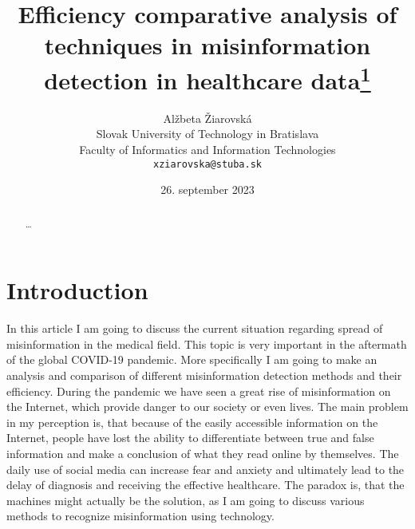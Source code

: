\documentclass[11pt ,english,a4paper]{article}
\title{Efficiency comparative analysis of techniques in misinformation detection in healthcare data\thanks{Semestral project in subject Engineering Methods, ac. year 2023/24, guidance: MSc. Mirwais Ahmadzai}}
\author{Alžbeta Žiarovská\\[2pt]
	{\small Slovak University of Technology in Bratislava}\\
	{\small Faculty of Informatics and Information Technologies}\\
	{\small \texttt{xziarovska@stuba.sk}}
	}
\date{\small 26. september 2023}
\begin{document}
\maketitle
\newpage

\begin{abstract}
\ldots
\end{abstract}
\newpage

\section{Introduction}\label{intro}

In this article I am going to discuss the current situation regarding spread of misinformation in the medical field. This topic is very important in the aftermath of the global COVID-19 pandemic. More specifically I am going to make an analysis and comparison of different misinformation detection methods and their efficiency. During the pandemic we have seen a great rise of misinformation on the Internet, which provide danger to our society or even lives. \cite{war18dr} The main problem in my perception is, that because of the easily accessible information on the Internet, people have lost the ability to differentiate between true and false information and make a conclusion of what they read online by themselves. \cite{ahm23impact} The daily use of social media can increase fear and anxiety and ultimately lead to the delay of diagnosis and receiving the effective healthcare. \cite{wa19sys} The paradox is, that the machines might actually be the solution, as I am going to discuss various methods to recognize misinformation using technology. \cite{chap22unmask}

I am going to focus on comparing fact-checking and machine learning models as s way to find the medical misinformation. The fact-checking can be done manually or automatically which I am going to introduce more deeply in Section \ref{tech:fact}.\cite{bar21health} The other side I am going to take a closer look at are machine learning techniques including Naïve Bayes, Support Vector Machine and BERT-based model called Disease Myth Buster.\cite{bar21health}\cite{chap22unmask} I want to introduce these techniques and compare their efficiency in order to establish which one is the most suitable for a specific situation in healthcare.

In the first Section \ref{ter} I am giving a quick introduction into the terminology used later in the article, so it is easily understandable and could easily be found if necessary. In the Section \ref{mih} I describe the term misinformation, how it differs from disinformation \cite{lazer18science}. Also I am going to give a brief summary of historical development of misinformation spread. \cite{pos18short} It is important as well to mention affect that medical fake news might have on our lives, which I would like to address as well. \cite{who22infodemics} In the last one of the main sections, in Section \ref{tech}, I am taking a closer look at some of the methods used for misinformation recognition. I going to introduce them in a way, that would be easily understandable for all readers and state some of their outputs, so I can compare their effectiveness and possible impact in the future in Conclusion. \ref{conclusion}
\end{document}
